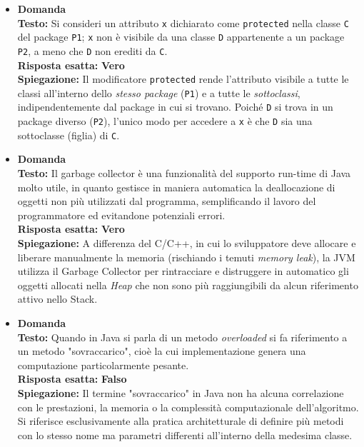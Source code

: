 \documentclass[12pt, a4paper]{article}
\begin{document}
\begin{itemize}
    \item {}\textbf{Domanda \thedomanda} \\
    \textbf{Testo:} Si consideri un attributo \texttt{x} dichiarato come \texttt{protected} nella classe \texttt{C} del package \texttt{P1}; \texttt{x} non è visibile da una classe \texttt{D} appartenente a un package \texttt{P2}, a meno che \texttt{D} non erediti da \texttt{C}. \\
    \textbf{Risposta esatta:} \textbf{Vero} \\
    \textbf{Spiegazione:} Il modificatore \texttt{protected} rende l'attributo visibile a tutte le classi all'interno dello \textit{stesso package} (\texttt{P1}) e a tutte le \textit{sottoclassi}, indipendentemente dal package in cui si trovano. Poiché \texttt{D} si trova in un package diverso (\texttt{P2}), l'unico modo per accedere a \texttt{x} è che \texttt{D} sia una sottoclasse (figlia) di \texttt{C}.
    \vspace{0.3cm}

    \item {}\textbf{Domanda \thedomanda} \\
    \textbf{Testo:} Il garbage collector è una funzionalità del supporto run-time di Java molto utile, in quanto gestisce in maniera automatica la deallocazione di oggetti non più utilizzati dal programma, semplificando il lavoro del programmatore ed evitandone potenziali errori. \\
    \textbf{Risposta esatta:} \textbf{Vero} \\
    \textbf{Spiegazione:} A differenza del C/C++, in cui lo sviluppatore deve allocare e liberare manualmente la memoria (rischiando i temuti \textit{memory leak}), la JVM utilizza il Garbage Collector per rintracciare e distruggere in automatico gli oggetti allocati nella \textit{Heap} che non sono più raggiungibili da alcun riferimento attivo nello Stack.
    \vspace{0.3cm}

    \item {}\textbf{Domanda \thedomanda} \\
    \textbf{Testo:} Quando in Java si parla di un metodo \textit{overloaded} si fa riferimento a un metodo "sovraccarico", cioè la cui implementazione genera una computazione particolarmente pesante. \\
    \textbf{Risposta esatta:} \textbf{Falso} \\
    \textbf{Spiegazione:} Il termine "sovraccarico" in Java non ha alcuna correlazione con le prestazioni, la memoria o la complessità computazionale dell'algoritmo. Si riferisce esclusivamente alla pratica architetturale di definire più metodi con lo stesso nome ma parametri differenti all'interno della medesima classe.
    \vspace{0.3cm}


\end{itemize}
\end{document}

